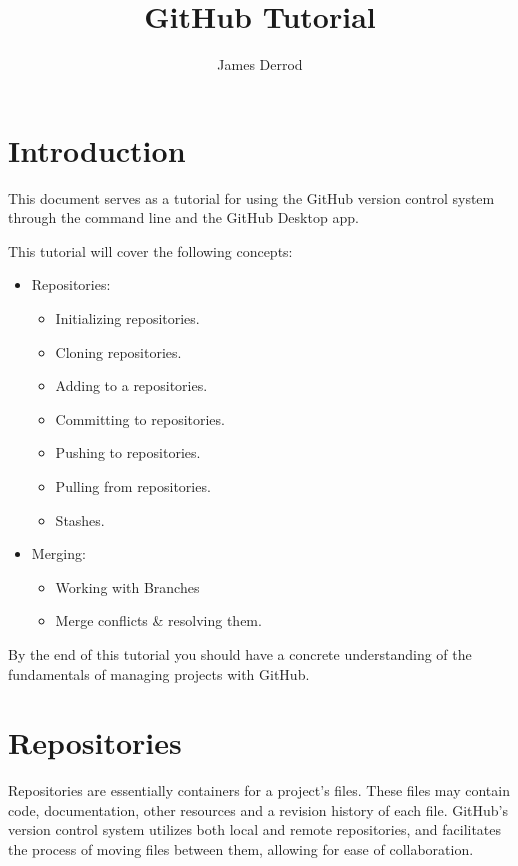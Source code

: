 \documentclass[10pt,twocolumn]{article}
\title{GitHub Tutorial}
\author{James Derrod}
\affiliation{Occidental College}
\begin{document}
\maketitle

\section{Introduction}

This document serves as a tutorial for using the GitHub version control system through the command line and the GitHub Desktop app.


This tutorial will cover the following concepts:
\begin{itemize}
    \item Repositories:
    \begin{itemize}
        \item Initializing repositories.
        \item Cloning repositories.
        \item Adding to a repositories.
        \item Committing to repositories.
        \item Pushing to repositories.
        \item Pulling from repositories.
        \item Stashes.
    \end{itemize}
    \item Merging:
    \begin{itemize}
        \item Working with Branches
        \item Merge conflicts \& resolving them.
    \end{itemize}    
\end{itemize}

By the end of this tutorial you should have a concrete understanding of the fundamentals of managing projects with GitHub.

\section{Repositories}
Repositories are essentially containers for a project's files. These files may contain code, documentation, other resources and a revision history of each file. GitHub's version control system utilizes both local and remote repositories, and facilitates the process of moving files between them, allowing for ease of collaboration.
\end{document}
